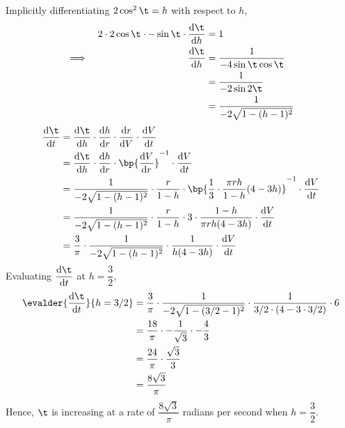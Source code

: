 \documentclass{echw}
\begin{document}
            Implicitly differentiating $2\cos^2\t = h$ with respect to $h$,
            \begin{alignat*}{2}
                &&2\cdot 2 \cos\t \cdot -\sin\t \cdot \der{\t}{h} &= 1\\
                \implies&&\der{\t}{h} &= \dfrac{1}{-4\sin\t\cos\t}\\
                && &= \dfrac1{-2\sin 2\t}\\
                && &= \dfrac1{-2 \sqrt{1 - (h-1)^2}}
            \end{alignat*}
            \begin{align*}
                \der{\t}{t} &= \der{\t}{h} \cdot \der{h}{r} \cdot \der{r}{V} \cdot \der{V}{t}\\
                &= \der{\t}{h} \cdot \der{h}{r} \cdot \bp{\der{V}{r}}^{-1} \cdot \der{V}{t}\\
                &= \dfrac1{-2 \sqrt{1 - (h-1)^2}} \cdot \dfrac{r}{1-h} \cdot \bp{\dfrac13 \cdot \dfrac{\pi rh}{1-h} (4-3h)}^{-1} \cdot \der{V}{t}\\
                &= \dfrac1{-2 \sqrt{1 - (h-1)^2}} \cdot \dfrac{r}{1-h} \cdot 3 \cdot \dfrac{1-h}{\pi rh(4-3h)}  \cdot \der{V}{t}\\
                &= \dfrac3{\pi} \cdot \dfrac1{-2 \sqrt{1 - (h-1)^2}} \cdot \dfrac1{h(4-3h)}  \cdot \der{V}{t}
            \end{align*}
            Evaluating $\der{\t}{t}$ at $h = \dfrac32$,
            \begin{align*}
                \evalder{\der{\t}{t}}{h = 3/2} &= \dfrac3{\pi} \cdot \dfrac1{-2 \sqrt{1 - (3/2-1)^2}} \cdot \dfrac1{3/2 \cdot (4-3\cdot 3/2)}  \cdot 6\\
                &= \dfrac{18}{\pi} \cdot -\dfrac1{\sqrt{3}} \cdot -\dfrac43\\
                &= \dfrac{24}{\pi} \cdot \dfrac{\sqrt 3}{3}\\
                &= \dfrac{8\sqrt{3}}{\pi}
            \end{align*}
            Hence, $\t$ is increasing at a rate of $\dfrac{8\sqrt3}{\pi}$ radians per second when $h = \dfrac32$.

\end{document}
